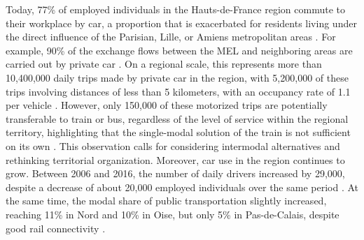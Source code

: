 \begin{refsegment}
Today, 77\% of employed individuals in the Hauts-de-France region commute to their workplace by car, a proportion that is exacerbated for residents living under the direct influence of the Parisian, Lille, or Amiens metropolitan areas \textcolor{blue}{\autocite[52]{ceser_hauts-de-france_mobilite_2021}}. For example, 90\% of the exchange flows between the \acrshort{MEL} and neighboring areas are carried out by private car \textcolor{blue}{\autocite[171]{region_hauts-de-france_sraddet_2024}}. On a regional scale, this represents more than 10,400,000 daily trips made by private car in the region, with 5,200,000 of these trips involving distances of less than 5 kilometers, with an occupancy rate of 1.1 per vehicle \textcolor{blue}{\autocite[171]{region_hauts-de-france_sraddet_2024}}. However, only 150,000 of these motorized trips are potentially transferable to train or bus, regardless of the level of service within the regional territory, highlighting that the single-modal solution of the train is not sufficient on its own \textcolor{blue}{\autocite[7-8]{observatoire_des_territoires_se_2019}}. This observation calls for considering intermodal alternatives and rethinking territorial organization. Moreover, car use in the region continues to grow. Between 2006 and 2016, the number of daily drivers increased by 29,000, despite a decrease of about 20,000 employed individuals over the same period \textcolor{blue}{\autocite[58]{ceser_hauts-de-france_mobilite_2021}}. At the same time, the modal share of public transportation slightly increased, reaching 11\% in Nord and 10\% in Oise, but only 5\% in Pas-de-Calais, despite good rail connectivity \textcolor{blue}{\autocite[58]{ceser_hauts-de-france_mobilite_2021}}.%


\end{refsegment}

